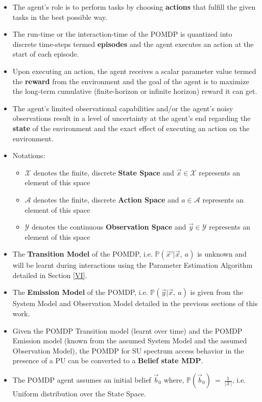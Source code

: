 \documentclass[12pt, draftcls, onecolumn]{IEEEtran}
\begin{document}
\begin{itemize}
    \item The agent's role is to perform tasks by choosing \textbf{actions} that fulfill the given tasks in the best possible way.
    \item The run-time or the interaction-time of the POMDP is quantized into discrete time-steps termed \textbf{episodes} and the agent executes an action at the start of each episode.
    \item Upon executing an action, the agent receives a scalar parameter value termed the \textbf{reward} from the environment and the goal of the agent is to maximize the long-term cumulative (finite-horizon or infinite horizon) reward it can get.
    \item The agent's limited observational capabilities and/or the agent's noisy observations result in a level of uncertainty at the agent's end regarding the \textbf{state} of the environment and the exact effect of executing an action on the environment.
    \item Notations: \begin{itemize}
        \item $\mathcal{X}$ denotes the finite, discrete \textbf{State Space} and $\vec{x} \in \mathcal{X}$ represents an element of this space
        \item $\mathcal{A}$ denotes the finite, discrete \textbf{Action Space} and $a \in \mathcal{A}$ represents an element of this space
        \item $\mathcal{Y}$ denotes the continuous \textbf{Observation Space} and $\vec{y} \in \mathcal{Y}$ represents an element of this space
    \end{itemize}
    \item The \textbf{Transition Model} of the POMDP, i.e. $\mathbb{P}(\vec{x}'|\vec{x},\ a)$ is unknown and will be learnt during interactions using the Parameter Estimation Algorithm detailed in Section \ref{VI}.
    \item The \textbf{Emission Model} of the POMDP, i.e. $\mathbb{P}(\vec{y}|\vec{x},\ a)$ is given from the System Model and Observation Model detailed in the previous sections of this work.
    \item Given the POMDP Transition model (learnt over time) and the POMDP Emission model (known from the assumed System Model and the assumed Observation Model), the POMDP for SU spectrum access behavior in the presence of a PU can be converted to a \textbf{Belief state MDP}.
    \item The POMDP agent assumes an initial belief $\vec{b}_0$ where, $\mathbb{P}(\vec{b}_0)\ =\ \frac{1}{|\mathcal{X}|}$, i.e. Uniform distribution over the State Space.

\end{itemize}
\end{document}
